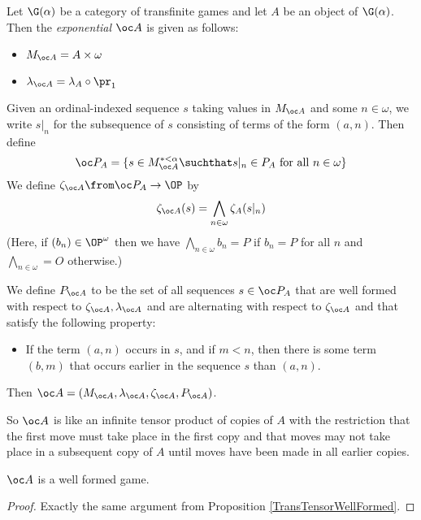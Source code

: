 \documentclass[11pt]{article} %
\begin{document}
\begin{definition}
  Let $\G(\alpha)$ be a category of transfinite games and let $A$ be an object of $\G(\alpha)$.  Then the \emph{exponential} $\oc A$ is given as follows:
  \begin{itemize}
    \item $M_{\oc A} = A\times\omega$
    \item $\lambda_{\oc A} = \lambda_A\circ\pr_1$
  \end{itemize}

  Given an ordinal-indexed sequence $s$ taking values in $M_{\oc A}$ and some $n\in\omega$, we write $s\vert_n$ for the subsequence of $s$ consisting of terms of the form $(a,n)$.  Then define
  \[
    \oc P_A = \{s\in M_{\oc A}^{*<\alpha}\suchthat s\vert_n\in P_A\textrm{ for all }n\in \omega\}
    \]
  We define $\zeta_{\oc A}\from \oc P_A\to \OP$ by
  \[
    \zeta_{\oc A}(s) = \bigwedge_{n\in \omega} \zeta_A(s\vert_n)
    \]
  (Here, if $(b_n)\in\OP^\omega$ then we have $\bigwedge_{n\in\omega} b_n = P$ if $b_n=P$ for all $n$ and $\bigwedge_{n\in\omega}=O$ otherwise.)

  We define $P_{\oc A}$ to be the set of all sequences $s\in\oc P_A$ that are well formed with respect to $\zeta_{\oc A},\lambda_{\oc A}$ and are alternating with respect to $\zeta_{\oc A}$ and that satisfy the following property:
  
  \begin{itemize}
    \item If the term $(a,n)$ occurs in $s$, and if $m<n$, then there is some term $(b,m)$ that occurs earlier in the sequence $s$ than $(a,n)$.  
  \end{itemize}

  Then $\oc A=(M_{\oc A},\lambda_{\oc A},\zeta_{\oc A},P_{\oc A})$.  
\end{definition}

So $\oc A$ is like an infinite tensor product of copies of $A$ with the restriction that the first move must take place in the first copy and that moves may not take place in a subsequent copy of $A$ until moves have been made in all earlier copies.  

\begin{proposition}
  $\oc A$ is a well formed game.
  \begin{proof}
    Exactly the same argument from Proposition \ref{TransTensorWellFormed}.
  \end{proof}
\end{proposition}
\end{document}
